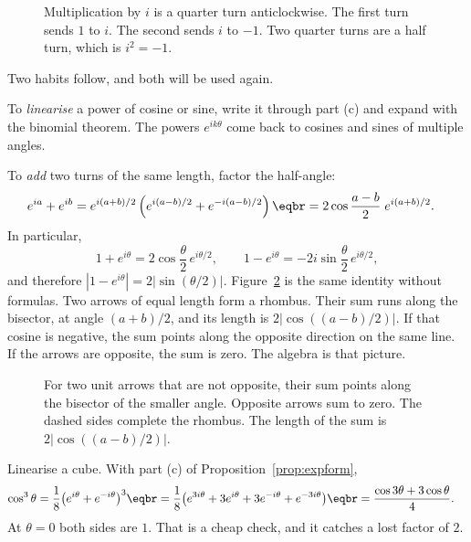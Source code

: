 \begin{figure}[ht]
\centering
{}
\caption{Multiplication by $i$ is a quarter turn anticlockwise. The first turn sends $1$ to $i$. The second sends $i$ to $-1$. Two quarter turns are a half turn, which is $i^2=-1$.}
\label{fig:turn}
\end{figure}

Two habits follow, and both will be used again.

To \emph{linearise} a power of cosine or sine, write it through part (c) and expand with the binomial theorem. The powers $e^{ik\theta}$ come back to cosines and sines of multiple angles.

To \emph{add} two turns of the same length, factor the half-angle:
\begin{align*}
e^{ia}+e^{ib}&=e^{i(a+b)/2}\left(e^{i(a-b)/2}+e^{-i(a-b)/2}\right)\eqbr=2\cos\frac{a-b}2\;e^{i(a+b)/2}.
\end{align*}
In particular,
\[
1+e^{i\theta}=2\cos\frac\theta2\,e^{i\theta/2},\qquad 1-e^{i\theta}=-2i\sin\frac\theta2\,e^{i\theta/2},
\]
and therefore $|1-e^{i\theta}|=2\bigl|\sin(\theta/2)\bigr|$. Figure~\ref{fig:rhombus} is the same identity without formulas. Two arrows of equal length form a rhombus. Their sum runs along the bisector, at angle $(a+b)/2$, and its length is $2\bigl|\cos((a-b)/2)\bigr|$. If that cosine is negative, the sum points along the opposite direction on the same line. If the arrows are opposite, the sum is zero. The algebra is that picture.

\begin{figure}[ht]
\centering
{}
\caption{For two unit arrows that are not opposite, their sum points along the bisector of the smaller angle. Opposite arrows sum to zero. The dashed sides complete the rhombus. The length of the sum is $2\bigl|\cos((a-b)/2)\bigr|$.}
\label{fig:rhombus}
\end{figure}

\begin{example}
Linearise a cube. With part (c) of Proposition~\ref{prop:expform},
\begin{align*}
\cos^3\theta&=\frac18\bigl(e^{i\theta}+e^{-i\theta}\bigr)^3\eqbr=\frac18\bigl(e^{3i\theta}+3e^{i\theta}+3e^{-i\theta}+e^{-3i\theta}\bigr)\eqbr=\frac{\cos3\theta+3\cos\theta}4.
\end{align*}
At $\theta=0$ both sides are $1$. That is a cheap check, and it catches a lost factor of $2$.
\end{example}


